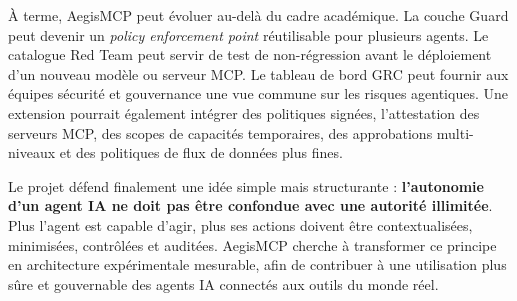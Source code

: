 À terme, AegisMCP peut évoluer au-delà du cadre académique. La couche Guard peut devenir un \textit{policy enforcement point} réutilisable pour plusieurs agents. Le catalogue Red Team peut servir de test de non-régression avant le déploiement d'un nouveau modèle ou serveur MCP. Le tableau de bord GRC peut fournir aux équipes sécurité et gouvernance une vue commune sur les risques agentiques. Une extension pourrait également intégrer des politiques signées, l'attestation des serveurs MCP, des scopes de capacités temporaires, des approbations multi-niveaux et des politiques de flux de données plus fines.

Le projet défend finalement une idée simple mais structurante : \textbf{l'autonomie d'un agent IA ne doit pas être confondue avec une autorité illimitée}. Plus l'agent est capable d'agir, plus ses actions doivent être contextualisées, minimisées, contrôlées et auditées. AegisMCP cherche à transformer ce principe en architecture expérimentale mesurable, afin de contribuer à une utilisation plus sûre et gouvernable des agents IA connectés aux outils du monde réel.
